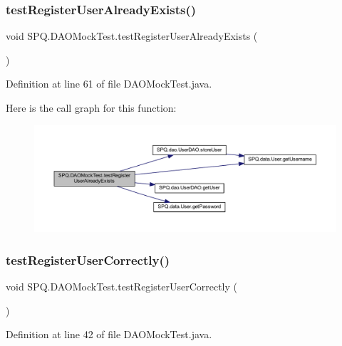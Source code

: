 \subsubsection{\texorpdfstring{test\+Register\+User\+Already\+Exists()}{testRegisterUserAlreadyExists()}}
{\footnotesize\ttfamily void S\+P\+Q.\+D\+A\+O\+Mock\+Test.\+test\+Register\+User\+Already\+Exists (\begin{DoxyParamCaption}{ }\end{DoxyParamCaption})}



Definition at line 61 of file D\+A\+O\+Mock\+Test.\+java.

Here is the call graph for this function\+:\nopagebreak
\begin{figure}[H]
\begin{center}
\leavevmode
\includegraphics[width=350pt]{class_s_p_q_1_1_d_a_o_mock_test_a76004a006ddce595edc7011aafccbe7e_cgraph}
\end{center}
\end{figure}
\mbox{\label{class_s_p_q_1_1_d_a_o_mock_test_a52505d1cfefe105f8098147df9d2fce0}} 
\subsubsection{\texorpdfstring{test\+Register\+User\+Correctly()}{testRegisterUserCorrectly()}}
{\footnotesize\ttfamily void S\+P\+Q.\+D\+A\+O\+Mock\+Test.\+test\+Register\+User\+Correctly (\begin{DoxyParamCaption}{ }\end{DoxyParamCaption})}



Definition at line 42 of file D\+A\+O\+Mock\+Test.\+java.

